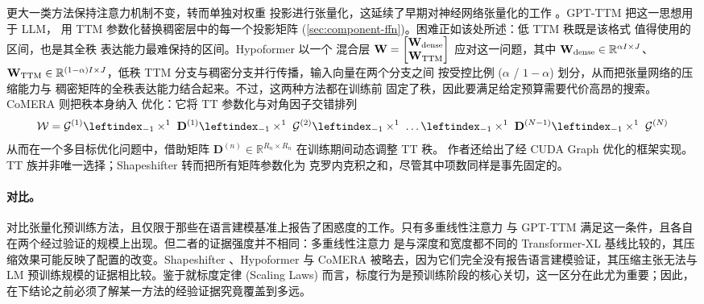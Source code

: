 \documentclass[11pt]{article}
\newcommand{\R}{\mathbb{R}}
\newcommand{\ten}[1]{\mathcal{#1}}
\newcommand{\mat}[1]{\mathbf{#1}}
\begin{document}
更大一类方法保持注意力机制不变，转而单独对权重
投影进行张量化，这延续了早期对神经网络张量化的工作
\cite{novikov2015tensorizing}。GPT-TTM \cite{chekalina2023ttm} 把这一思想用于 LLM，
用 TTM 参数化替换稠密层中的每一个投影矩阵
(\cref{sec:component-ffn})。困难正如该处所述：低 TTM 秩既是该格式
值得使用的区间，也是其全秩
表达能力最难保持的区间。Hypoformer \cite{li2022hypoformer} 以一个
混合层 $\mat{W} = \begin{bmatrix} \mat{W}_{\rm dense} \\ \mat{W}_{\rm TTM}  \end{bmatrix}$ 应对这一问题，其中 $\mat{W}_{\rm dense} \in \R^{\alpha I \times J}$、$\mat{W}_{\rm TTM} \in \R^{(1-\alpha)I \times J}$，低秩 TTM
分支与稠密分支并行传播，输入向量在两个分支之间
按受控比例 ($\alpha$ / $1 - \alpha$) 划分，从而把张量网络的压缩能力与
稠密矩阵的全秩表达能力结合起来。不过，这两种方法都在训练前
固定了秩，因此要满足给定预算需要代价高昂的搜索。CoMERA \cite{yang2024comera} 则把秩本身纳入
优化：它将 TT 参数化与对角因子交错排列
\begin{equation*}
  \ten{W} = \ten{G}^{(1)} \leftindex_{-1} \times^1 ~ \mat{D}^{(1)} \leftindex_{-1} \times^1 ~ \ten{G}^{(2)} \leftindex_{-1} \times^1 ~ \dots \leftindex_{-1} \times^1 ~ \mat{D}^{(N - 1)} \leftindex_{-1} \times^1 ~ \ten{G}^{(N)}
\end{equation*}
从而在一个多目标优化问题中，借助矩阵 $\mat{D}^{(n)} \in \R^{R_{n} \times R_{n}}$ 在训练期间动态调整 TT 秩。
作者还给出了经 CUDA Graph 优化的框架实现。
TT 族并非唯一选择；Shapeshifter \cite{pahani2021shapeshifter} 转而把所有矩阵参数化为
克罗内克积之和，尽管其中项数同样是事先固定的。

\paragraph{对比。} 
 对比张量化预训练方法，且仅限于那些在语言建模基准上报告了困惑度的工作。只有多重线性注意力 \cite{ma2019tensorized} 与 GPT-TTM \cite{chekalina2023ttm} 满足这一条件，且各自在两个经过验证的规模上出现。但二者的证据强度并不相同：多重线性注意力 \cite{ma2019tensorized} 是与深度和宽度都不同的 Transformer-XL 基线比较的，其压缩效果可能反映了配置的改变。Shapeshifter \cite{pahani2021shapeshifter}、Hypoformer \cite{li2022hypoformer} 与 CoMERA \cite{yang2024comera} 被略去，因为它们完全没有报告语言建模验证，其压缩主张无法与 LM 预训练规模的证据相比较。鉴于就标度定律 (Scaling Laws) \cite{kaplan2020scalinglaws} 而言，标度行为是预训练阶段的核心关切，这一区分在此尤为重要；因此，在下结论之前必须了解某一方法的经验证据究竟覆盖到多远。
\end{document}
